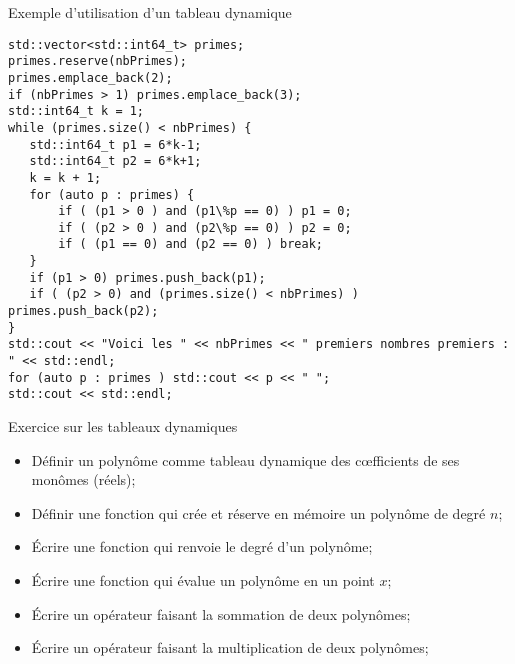\documentclass[compress,10pt,aspectratio=169]{beamer}
\begin{document}
\begin{frame}[fragile]{Exemple d'utilisation d'un tableau dynamique}
    \scriptsize

\begin{verbatim}
std::vector<std::int64_t> primes;
primes.reserve(nbPrimes);
primes.emplace_back(2);
if (nbPrimes > 1) primes.emplace_back(3);
std::int64_t k = 1;
while (primes.size() < nbPrimes) {
   std::int64_t p1 = 6*k-1;
   std::int64_t p2 = 6*k+1;
   k = k + 1;
   for (auto p : primes) {
       if ( (p1 > 0 ) and (p1\%p == 0) ) p1 = 0;
       if ( (p2 > 0 ) and (p2\%p == 0) ) p2 = 0;
       if ( (p1 == 0) and (p2 == 0) ) break;
   }
   if (p1 > 0) primes.push_back(p1);
   if ( (p2 > 0) and (primes.size() < nbPrimes) ) primes.push_back(p2);
}
std::cout << "Voici les " << nbPrimes << " premiers nombres premiers :  " << std::endl;
for (auto p : primes ) std::cout << p << " ";
std::cout << std::endl;  
\end{verbatim}
\end{frame}

\begin{frame}[fragile]{Exercice sur les tableaux dynamiques}
    \scriptsize
  
    \begin{itemize}
    \item Définir un polynôme comme tableau dynamique des c{\oe}fficients de ses monômes (réels);
    \item Définir une fonction qui crée et réserve en mémoire un polynôme de degré $n$;
    \item Écrire une fonction qui renvoie le degré d'un polynôme;
    \item Écrire une fonction qui évalue un polynôme en un point $x$;
    \item Écrire un opérateur faisant la sommation de deux polynômes;
    \item Écrire un opérateur faisant la multiplication de deux polynômes;
    \end{itemize}
\end{frame}
\end{document}
